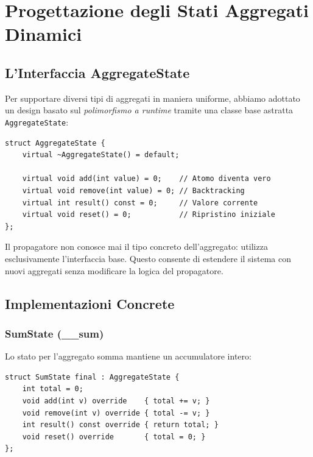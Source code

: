 \documentclass[a4paper,12pt,twoside,openright]{report}
\begin{document}
\chapter{Progettazione degli Stati Aggregati Dinamici}
\label{ch:aggregati}

\section{L'Interfaccia AggregateState}

Per supportare diversi tipi di aggregati in maniera uniforme, abbiamo adottato un design basato sul \emph{polimorfismo a runtime} tramite una classe base astratta \texttt{AggregateState}:

\begin{lstlisting}[style=cppstyle,caption={Interfaccia \texttt{AggregateState}}]
struct AggregateState {
    virtual ~AggregateState() = default;

    virtual void add(int value) = 0;    // Atomo diventa vero
    virtual void remove(int value) = 0; // Backtracking
    virtual int result() const = 0;     // Valore corrente
    virtual void reset() = 0;           // Ripristino iniziale
};
\end{lstlisting}

Il propagatore non conosce mai il tipo concreto dell'aggregato: utilizza esclusivamente l'interfaccia base. Questo consente di estendere il sistema con nuovi aggregati senza modificare la logica del propagatore.

\section{Implementazioni Concrete}

\subsection{SumState (\_\_sum)}

Lo stato per l'aggregato somma mantiene un accumulatore intero:

\begin{lstlisting}[style=cppstyle,caption={Implementazione di \texttt{SumState}}]
struct SumState final : AggregateState {
    int total = 0;
    void add(int v) override    { total += v; }
    void remove(int v) override { total -= v; }
    int result() const override { return total; }
    void reset() override       { total = 0; }
};
\end{lstlisting}
\end{document}
